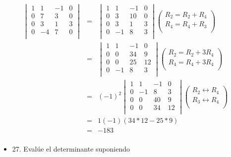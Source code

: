 \documentclass[
]{article}
\begin{document}
\[\begin{matrix}
\begin{vmatrix}
1 & 1 & - 1 & 0 \\
0 & 7 & 3 & 0 \\
0 & 3 & 1 & 3 \\
0 & - 4 & 7 & 0 \\
\end{vmatrix} & = & \begin{vmatrix}
1 & 1 & - 1 & 0 \\
0 & 3 & 10 & 0 \\
0 & 3 & 1 & 3 \\
0 & - 1 & 8 & 3 \\
\end{vmatrix}\begin{pmatrix}
R_{2} = R_{2} + R_{4} \\
R_{4} = R_{4} + R_{3} \\
\end{pmatrix} \\
 & = & \begin{vmatrix}
1 & 1 & - 1 & 0 \\
0 & 0 & 34 & 9 \\
0 & 0 & 25 & 12 \\
0 & - 1 & 8 & 3 \\
\end{vmatrix}\begin{pmatrix}
R_{2} = R_{2} + 3R_{4} \\
R_{4} = R_{4} + 3R_{4} \\
\end{pmatrix} \\
 & = & ( - 1)^{2}\begin{vmatrix}
1 & 1 & - 1 & 0 \\
0 & - 1 & 8 & 3 \\
0 & 0 & 40 & 9 \\
0 & 0 & 34 & 12 \\
\end{vmatrix}\begin{pmatrix}
R_{2} \leftrightarrow R_{4} \\
R_{3} \leftrightarrow R_{4} \\
\end{pmatrix} \\
 & = & 1( - 1)(34*12 - 25*9) \\
 & = & - 183 \\
\end{matrix}\]

\begin{itemize}
\item
  27. Evalúe el determinante suponiendo
\end{itemize}
\end{document}

